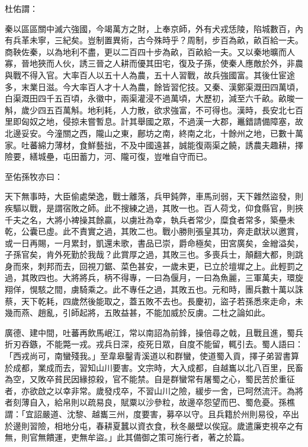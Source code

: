 \begin{pinyinscope}
 杜佑謂：



 秦以區區關中滅六強國，今竭萬方之財，上奉京師，外有犬戎恁陵，陷城數百，內有兵革未寧，三紀矣。豈制置異術，古今殊時乎？周制，步百為畝，畝百給一夫。商鞅佐秦，以為地利不盡，更以二百四十步為畝，百畝給一夫。又以秦地曠而人寡，晉地狹而人伙，誘三晉之人耕而優其田宅，復及子孫，使秦人應敵於外，非農與戰不得入官。大率百人以五十人為農，五十人習戰，故兵強國富。其後仕宦途多，末業日滋。今大率百人才十人為農，餘皆習佗技。又秦、漢鄭渠溉田四萬頃，白渠溉田四千五百頃，永徽中，兩渠灌浸不過萬頃，大歷初，減至六千畝。畝晙一斛，歲少四五百萬斛。地利耗，人力散，欲求強富，不可得也。漢時，長安北七百里即匈奴之地，侵掠未嘗暫息。計其舉國之眾，不過漢一大郡，鼉錯請備障塞，故北邊妥安。今潼關之西，隴山之東，鄜坊之南，終南之北，十餘州之地，已數十萬家。吐蕃綿力薄材，食鮮藝拙，不及中國遠甚，誠能復兩渠之饒，誘農夫趣耕，擇險要，繕城壘，屯田蓄力，河、隴可復，豈唯自守而已。



 至佑孫牧亦曰：



 天下無事時，大臣偷處榮逸，戰士離落，兵甲鈍弊，車馬刓弱，天下雜然盜發，則疾驅以戰，是謂宿敗之師。此不搜練之過，其敗一也。百人荷戈，仰食縣官，則挾千夫之名，大將小裨操其餘贏，以虜壯為幸，執兵者常少，糜食者常多，築壘未乾，公囊已虛。此不責實之過，其敗二也。戰小勝則張皇其功，奔走獻狀以邀賞，或一日再賜，一月累封，凱還未歌，書品已崇，爵命極矣，田宮廣矣，金繒溢矣，子孫官矣，肯外死勤於我哉？此賞厚之過，其敗三也。多喪兵士，顛翻大都，則跳身而來，刺邦而去，回視刀鋸、菜色甚安，一歲未更，已立於壇墀之上。此輕罰之過，其敗四也。大將將兵，柄不得專，一曰為偃月，一曰為魚麗，三軍萬夫，環旋翔佯，愰駭之間，虜騎乘之。此不專任之過，其敗五也。元和時，團兵數十萬以誅蔡，天下乾耗，四歲然後能取之，蓋五敗不去也。長慶初，盜子若孫悉來走命，未幾而燕、趙亂，引師起將，五敗益甚，不能加威於反虜。二杜之論如此。



 廣德、建中間，吐蕃再飲馬岷江，常以南詔為前鋒，操倍尋之戟，且戰且進，蜀兵折刃吞鏃，不能斃一戎。戎兵日深，疫死日眾，自度不能留，輒引去。蜀人語曰：「西戎尚可，南蠻殘我。」至韋皋鑿青溪道以和群蠻，使道蜀入貢，擇子弟習書算於成都，業成而去，習知山川要害。文宗時，大入成都，自越巂以北八百里，民畜為空，又敗卒貧民因緣掠殺，官不能禁。自是群蠻常有屠蜀之心，蜀民苦於重征者，亦欲啟之以幸非常。歲發戍卒，不習山川之險，緩步一舍，已呵然流汗。為將者刻薄自入，給帛則以疏易良，賦粟以沙參粒，故邊卒怨望而巴、蜀危憂。孫樵謂：「宜詔嚴道、沈黎、越巂三州，度要害，募卒以守。且兵籍於州則易役，卒出於邊則習險，相地分屯，春耕夏蠶以資衣食，秋冬嚴壁以俟寇。歲遣廉吏視卒之有無，則官無饋運，吏無牟盜。」此其備御之策可施行者，著之於篇。




\end{pinyinscope}
